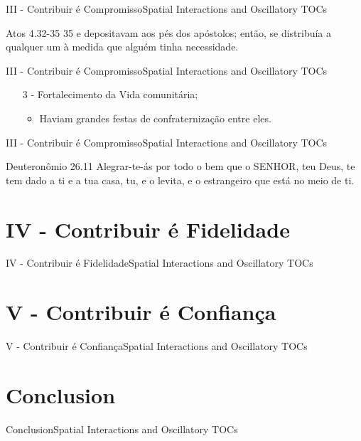 \documentclass[14pt,aspectratio=169]{beamer}
\newcommand{\TT}{Spatial Interactions and Oscillatory TOCs}
\newcommand{\PIII}{III - Contribuir é Compromisso}
\newcommand{\PIV}{IV - Contribuir é Fidelidade}
\newcommand{\PV}{V - Contribuir é Confiança}
\newcommand{\CO}{Conclusion}
\begin{document}
\begin{frame}{\PIII}{\TT}
 \begin{block}{Atos 4.32-35}
35 e depositavam aos pés dos apóstolos; então, se distribuía a qualquer um à medida que alguém tinha necessidade.
 \end{block}
\end{frame}

\begin{frame}{\PIII}{\TT}
 \begin{enumerate}
  \item[3 -] Fortalecimento da Vida comunitária;\pause
  \begin{itemize}
   \Large
   \item Haviam grandes festas de confraternização entre eles.
  \end{itemize}
 \end{enumerate}
\end{frame}

\begin{frame}{\PIII}{\TT}
 \begin{block}{Deuteronômio 26.11}
Alegrar-te-ás por todo o bem que o SENHOR, teu Deus, te tem dado a ti e a tua casa, tu, e o levita, e o estrangeiro que está no meio de ti.
 \end{block}
\end{frame}

\section{\PIV}
\begin{frame}{\PIV}{\TT}

\end{frame}

\section{\PV}
\begin{frame}{\PV}{\TT}

\end{frame}

\section{\CO}
\begin{frame}{\CO}{\TT}

\end{frame}
\end{document}
